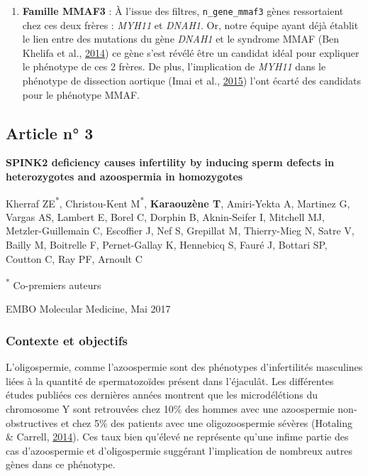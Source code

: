 \documentclass[12pt,twoside]{reedthesis}
\providecommand{\tightlist}{%
  \setlength{\itemsep}{0pt}\setlength{\parskip}{0pt}}
\theoremstyle{definition}
\theoremstyle{definition}
\theoremstyle{remark}
\begin{document}
  \begin{enumerate}
  \def\labelenumi{\arabic{enumi}.}
  \setcounter{enumi}{3}
  \tightlist
  \item
    \textbf{Famille MMAF3} : À l'issue des filtres,
    \texttt{n\_gene\_mmaf3} gènes ressortaient chez ces deux frères :
    \emph{MYH11} et \emph{DNAH1}. Or, notre équipe ayant déjà établit le
    lien entre des mutations du gène \emph{DNAH1} et le syndrome MMAF (Ben
    Khelifa et al., \protect\hyperlink{ref-BenKhelifa2014}{2014}) ce gène
    s'est révélé être un candidat idéal pour expliquer le phénotype de ces
    2 frères. De plus, l'implication de \emph{MYH11} dans le phénotype de
    dissection aortique (Imai et al.,
    \protect\hyperlink{ref-Imai2015}{2015}) l'ont écarté des candidats
    pour le phénotype MMAF.
  \end{enumerate}
  
  \newpage
  
  \subsection{Article n° 3}\label{article-n-3}
  
  \textbf{SPINK2 deficiency causes infertility by inducing sperm defects
  in heterozygotes and azoospermia in homozygotes}
  
  Kherraf ZE\textsuperscript{*}, Christou-Kent M\textsuperscript{*},
  \textbf{Karaouzène T}, Amiri-Yekta A, Martinez G, Vargas AS, Lambert E,
  Borel C, Dorphin B, Aknin-Seifer I, Mitchell MJ, Metzler-Guillemain C,
  Escoffier J, Nef S, Grepillat M, Thierry-Mieg N, Satre V, Bailly M,
  Boitrelle F, Pernet-Gallay K, Hennebicq S, Fauré J, Bottari SP, Coutton
  C, Ray PF, Arnoult C
  
  \textsuperscript{*} Co-premiers auteurs
  
  EMBO Molecular Medicine, Mai 2017
  
  \newpage
  
  \subsubsection{Contexte et objectifs}\label{contexte-et-objectifs}
  
  L'oligospermie, comme l'azoospermie sont des phénotypes d'infertilités
  masculines liées à la quantité de spermatozoïdes présent dans
  l'éjaculât. Les différentes études publiées ces dernières années
  montrent que les microdélétions du chromosome Y sont retrouvées chez
  10\% des hommes avec une azoospermie non-obstructives et chez 5\% des
  patients avec une oligozoospermie sévères (Hotaling \& Carrell,
  \protect\hyperlink{ref-Hotaling2014}{2014}). Ces taux bien qu'élevé ne
  représente qu'une infime partie des cas d'azoospermie et d'oligospermie
  suggérant l'implication de nombreux autres gènes dans ce phénotype.
  
\end{document}
